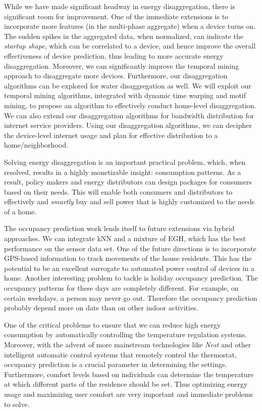 While we have made significant headway in energy disaggregation, there is significant room for improvement. One of the immediate extensions is to incorporate more features (in the multi-phase aggregate) when a device turns on. The sudden spikes in the aggregated data, when normalized, can indicate the \emph{startup shape}, which can be correlated to a device, and hence improve the overall effectiveness of device prediction, thus leading to more accurate energy disaggregation. Moreover, we can significantly improve the temporal mining approach to disaggregate more devices. Furthermore, our disaggregation algorithms can be explored for water disaggregation as well. We will exploit our temporal mining algorithms, integrated with dynamic time warping and motif mining, to propose an algorithm to effectively conduct home-level disaggregation. We can also extend our disaggregation algorithms for bandwidth distribution for internet service providers. Using our disaggregation algorithms, we can decipher the device-level internet usage and plan for effective distribution to a home/neighborhood. 

Solving energy disaggregation is an important practical problem, which, when resolved, results in a highly monetizable insight: consumption patterns. As a result, policy makers and energy distributors can design packages for consumers based on their needs. This will enable both consumers and distributors to effectively and \emph{smartly} buy and sell power that is highly customized to the needs of a home.


The occupancy prediction work lends itself to future extensions via hybrid approaches. We can integrate kNN and a mixture of EGH, which has the best performance on the sensor data set. One of the future directions is to incorporate GPS-based information to track movements of the house residents. This has the potential to be an excellent surrogate to automated power control of devices in a home. Another interesting problem to tackle is holiday occupancy prediction. The occupancy patterns for these days are completely different. For example, on certain weekdays, a person may never go out. Therefore the occupancy prediction probably depend more on date than on other indoor activities. 

One of the critical problems to ensure that we can reduce high energy consumption by automatically controlling the temperature regulation systems. Moreover, with the advent of more mainstream technologies like \emph{Nest} and other intelligent automatic control systems that remotely control the thermostat, occupancy prediction is a crucial parameter in determining the settings. Furthermore, comfort levels based on individuals can determine the temperature at which different parts of the residence should be set. Thus optimizing energy usage and maximizing user comfort are very important and immediate problems to solve.


